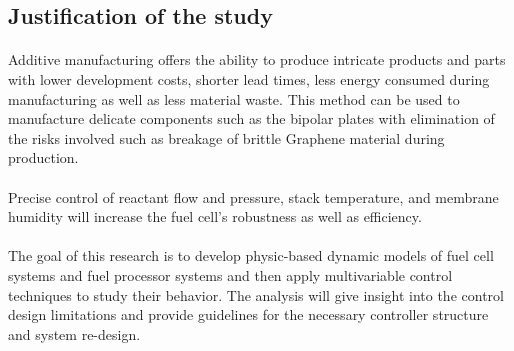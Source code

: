 \subsection{Justification of the study}
\paragraph{}Additive manufacturing offers the ability to produce intricate products and parts with lower development costs, shorter lead times, less energy consumed during manufacturing as well as less material waste. This method can be used to manufacture delicate components such as the bipolar plates with elimination of the risks involved such as breakage of brittle Graphene material during production.     
\paragraph{}Precise control of reactant flow and pressure, stack temperature, and membrane humidity will increase the fuel cell’s robustness as well as efficiency.
\paragraph{}The goal of this research is to develop physic-based dynamic models of fuel cell systems and fuel processor systems and then apply multivariable control techniques to study their behavior. The analysis will give insight into the control design limitations and provide guidelines for the necessary controller structure and system re-design.